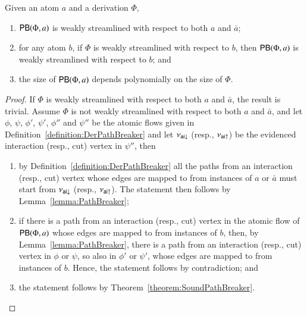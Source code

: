 \begin{proposition}\label{proposition:PathBreaker}
Given an atom $a$ and a derivation $\Phi$,
\begin{enumerate}
\item $\mathsf{PB}(\Phi,a)$ is weakly streamlined with respect to both $a$ and $\bar a$;
\item for any atom $b$, if $\Phi$ is weakly streamlined with respect to $b$, then $\mathsf{PB}(\Phi,a)$ is weakly streamlined with respect to $b$; and
\item the size of\/ $\mathsf{PB}(\Phi,a)$ depends polynomially on the size of\/ $\Phi$.
\end{enumerate}
\end{proposition}

\begin{proof}
If $\Phi$ is weakly streamlined with respect to both $a$ and $\bar a$, the result is trivial. Assume $\Phi$ is not weakly streamlined with respect to both $a$ and $\bar a$, and let $\phi$, $\psi$, $\phi'$, $\psi'$, $\phi''$ and $\psi''$ be the atomic flows given in Definition~\ref{definition:DerPathBreaker} and let $\nu_{\mathsf{ai}{\downarrow}}$ (resp., $\nu_{\mathsf{ai}{\uparrow}}$) be the evidenced interaction (resp., cut) vertex in $\psi''$, then
\begin{enumerate}
\item by Definition~\ref{definition:DerPathBreaker} all the paths from an interaction (resp., cut) vertex whose edges are mapped to from instances of $a$ or $\bar a$ must start from $\nu_{\mathsf{ai}{\downarrow}}$ (resp., $\nu_{\mathsf{ai}{\uparrow}}$). The statement then follows by Lemma~\vref{lemma:PathBreaker};
\item if there is a path from an interaction (resp., cut) vertex in the atomic flow of $\mathsf{PB}(\Phi,a)$ whose edges are mapped to from instances of $b$, then, by Lemma~\ref{lemma:PathBreaker}, there is a path from an interaction (resp., cut) vertex in $\phi$ or $\psi$, so also in $\phi'$ or $\psi'$, whose edges are mapped to from instances of $b$. Hence, the statement follows by contradiction; and
\item the statement follows by Theorem~\vref{theorem:SoundPathBreaker}.
\end{enumerate}
\end{proof}


